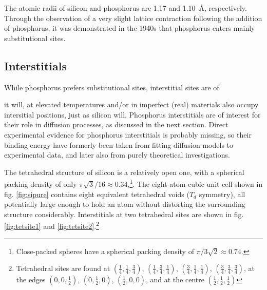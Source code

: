 \documentclass[11pt,bibliography=totoc,index=totoc]{scrbook}   %
\begin{document}

The atomic radii of silicon and phosphorus are 1.17 and 1.10~Å, respectively.
Through the observation of a very slight lattice contraction following the addition of phosphorus,
it was demonstrated in the 1940s that phosphorus enters mainly substitutional sites.\cite{Pearson:1949}




%
\subsection{Interstitials}\label{sec:PInterstitials}
%

While phosphorus prefers substitutional sites, interstitial sites are of 

it will, at elevated temperatures and/or in imperfect (real) materials also occupy intersitial positions, just as silicon will.
Phosphorus interstitials are of interest for their role in diffusion processes, as discussed in the next section.
Direct experimental evidence for phosphorus interstitials is probably missing, so their binding energy have formerly been taken from fitting diffusion models to experimental data, and later also from purely theoretical investigations.\cite[391]{Pichler:2004}

The tetrahedral structure of silicon is a relatively open one, with a spherical packing density of only $\pi\sqrt{3}/16\approx 0.34$,\footnote{Close-packed spheres have a spherical packing density of $\pi/3\sqrt{2} \approx 0.74$.}.
The eight-atom cubic unit cell shown in fig. \ref{fig:sipure} contains eight equivalent tetrahedral voids ($T_d$ symmetry), all potentially large enough to hold an atom without distorting the surrounding structure considerably.
Interstitials at two tetrahedral sites are shown in fig. \ref{fig:tetsite1} and \ref{fig:tetsite2}.\footnote{Tetrahedral sites are found at
$(\frac{1}{4},\frac{1}{4},\frac{3}{4})$, 
$(\frac{1}{4},\frac{3}{4},\frac{1}{4})$, 
$(\frac{3}{4},\frac{1}{4},\frac{1}{4})$, 
$(\frac{3}{4},\frac{3}{4},\frac{3}{4})$, 
at the edges
$(0,0,\frac{1}{2})$,
$(0,\frac{1}{2},0)$,
$(\frac{1}{2},0,0)$,
and at the centre
$(\frac{1}{2},\frac{1}{2},\frac{1}{2})$}
\end{document}
